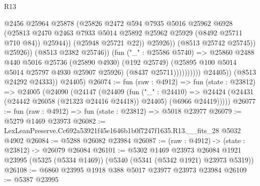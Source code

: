 \begin{lexlean}{R13}
\begin{coremodule}
                                            @2456
                                            @25964
                                            @25878
                                            (@25826
                                              @2472
                                              @594
                                              @7935
                                              @5016
                                              @25962
                                              @6928
                                              (@25813
                                                @2470
                                                @2463
                                                @7933
                                                @5014
                                                @25892
                                                @25962
                                                @25929
                                                (@8492 @25711 @710 @84))
                                              @25944))
                                          (@25948 @25721 @22))
                                        @25926))
                                    (@8513 @25742 @25745))
                                  @25926))
                              (@8513 @2382 @25746))
                            (fun ("_" : @25586 @5740) =>
                            @25860
                              @2488
                              @440
                              @5016
                              @25736
                              (@25890 @4930)
                              (@192 @25749)
                              (@25895 @100 @5014 @5014 @25797 @4930 @25907 @25926)
                              (@8437 @25711))))))))))
            @24405))
        (@8513 @24292 @24333))
      @24405)
@26074 := fun (raw : @4912) =>
  fun (state : @23812) =>
  @24005
    (@24090
      (@24147
        (@24409
          (fun ("_" : @24410) =>
          @24424 (@24431 (@24442 @26058 (@21323 @24416 @24418)) @24405) (@6966 @24419)))))
@26077 := fun (raw : @4912) => fun (state : @23812) => @5018 @23977
@26079 := @5279 @1469 @23973
@26082 := LexLeanPreserve.Cc692a53921f45e1646b1b0f7247f1635.R13.__fits_28 @5032 @4902
@26084 := @5288 @26082 @23984
@26087 := (raw : @4912) -> (state : @23812) -> @26079 @26084
@26101 := @5302
    @1469
    @23973
    @26084
    @1921
    @23995
    (@5325 (@5334 @1469))
    (@5340 (@5341 (@5342 @1921) @23973 @5319))
@26108 := @6860 @23995 @1918 @388 @5017 @23977 @23973 @23984
@26109 := @5387 @23995

\end{coremodule}
\end{lexlean}
